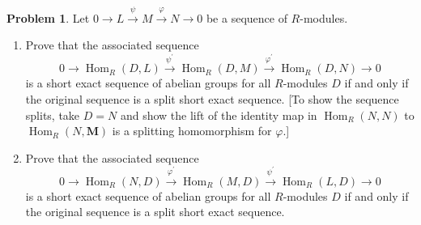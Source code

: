 \documentclass{amsart}
\numberwithin{equation}{section}
\theoremstyle{definition}
\newtheorem{problem}[thm]{Problem}
\begin{document}
\begin{problem}
 Let \(0 \longrightarrow L \xrightarrow{\psi} M \xrightarrow{\varphi} N \longrightarrow 0\) be a sequence of \(R\)-modules.
\begin{enumerate}
 \item Prove that the associated sequence
\[
0 \longrightarrow \operatorname{Hom}_R(D, L) \xrightarrow{\psi^{\prime}} \operatorname{Hom}_R(D, M) \xrightarrow{\varphi^{\prime}} \operatorname{Hom}_R(D, N) \longrightarrow 0
\]
is a short exact sequence of abelian groups for all \(R\)-modules \(D\) if and only if the original sequence is a split short exact sequence. [To show the sequence splits, take \(D=N\) and show the lift of the identity map in \(\operatorname{Hom}_R(N, N)\) to \(\operatorname{Hom}_R(N, \boldsymbol{M})\) is a splitting homomorphism for \(\varphi\).]
\item Prove that the associated sequence
\[
0 \longrightarrow \operatorname{Hom}_R(N, D) \xrightarrow{\varphi^{\prime}} \operatorname{Hom}_R(M, D) \xrightarrow{\psi^{\prime}} \operatorname{Hom}_R(L, D) \longrightarrow 0
\]
is a short exact sequence of abelian groups for all \(R\)-modules \(D\) if and only if the original sequence is a split short exact sequence.
\end{enumerate}

\end{problem}
\end{document}
